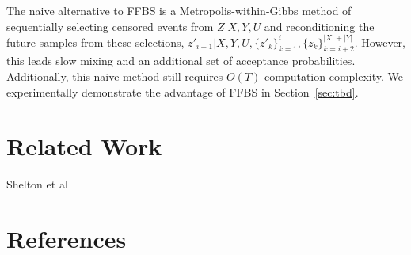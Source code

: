 \documentclass[11pt]{article}
\begin{document}
The naive alternative to FFBS is a Metropolis-within-Gibbs method of sequentially selecting censored events from $Z|X,Y,U$ and reconditioning the future samples from these selections, $z'_{i+1} | X,Y,U,\{z'_k\}_{k=1}^i, \{z_k\}_{k=i+2}^{|X|+|Y|}$. However, this leads slow mixing and an additional set of acceptance probabilities. Additionally, this naive method still requires $O(T)$ computation complexity. We experimentally demonstrate the advantage of FFBS in Section~\ref{sec:tbd}.





\newpage
\section*{Related Work}

Shelton et al~\cite{AAAI1816985}


\newpage
\section*{References}


\end{document}
